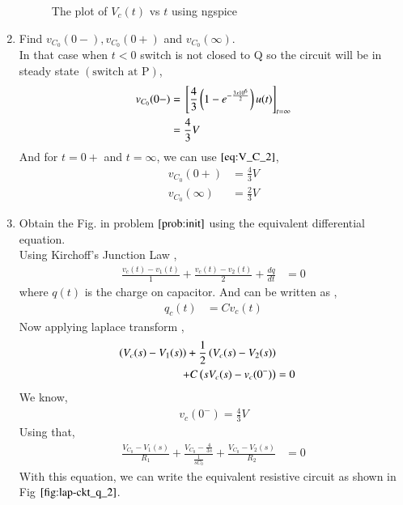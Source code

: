 \documentclass[journal,12pt,twocolumn]{IEEEtran}
\renewcommand\thesection{\arabic{section}}
\begin{document}
\begin{enumerate}[label=\arabic*.,ref=\thesection.\theenumi]
\begin{figure}[!ht]
			\caption{The plot of $V_c(t)$ vs $t$ using ngspice}
			\label{fig:ngspice_2}
\end{figure}
\item Find $v_{C_0}(0-), v_{C_0}(0+)$ and  $v_{C_0}(\infty) $.\\
	\solution In that case when $t < 0$ switch is not closed to Q so the circuit will be in steady state $(\text{switch at P})$,
	  \begin{align}
		  v_{C_0}(0-) &= {}\left[\frac{4}{3}\left(1 - e^{-\frac{3x 10^6}{2}}\right)u(t)\right]_{t = \infty} \\
			      &= \frac{4}{3}V
	   \end{align}
	   And for $t = 0+$ and $t = \infty$, we can use $\eqref{eq:V_C_2}$,
	    \begin{align}
		    v_{C_0}(0+) &= \frac{4}{3}V \\
		    v_{C_0}(\infty) &= \frac{2}{3}V
	    \end{align}
\item Obtain the Fig.  in problem 
		$\ref{prob:init}$
			using the equivalent differential equation.\\
	\solution Using Kirchoff's Junction Law ,
	  \begin{align}
		  \frac{v_c(t) - v_1(t)}{1} + \frac{v_c(t) - v_2(t)}{2} + \frac{dq}{dt} &= 0
	  \end{align}
	  where $q(t)$ is the charge on capacitor. And can be written as ,
	   \begin{align}
		   q_c(t) &= Cv_c(t)  
	   \end{align}
	   Now applying laplace transform ,
	   \begin{align}
		   \left(V_c(s) - V_1(s)\right) + \frac{1}{2}\left(V_c(s) - V_2(s)\right)  \nonumber \\ + C\left(sV_c(s) - v_c(0^-)\right) &= 0
	   \end{align}
	   We know,
	    \begin{align}
		    v_c(0^-) = \frac{4}{3}V
            \end{align}
            Using that,
	     \begin{align}
		     \frac{V_{C_0} - V_1(s)}{R_1} + \frac{V_{C_0} - \frac{4}{3s}}{\frac{1}{sC_0}} + \frac{V_{C_0} - V_2(s)}{R_2}  &= 0 
	     \end{align}
	     With this equation, we can write the equivalent resistive circuit as shown in Fig $\ref{fig:lap-ckt_q_2}$. 
 \end{enumerate}
\end{document}
